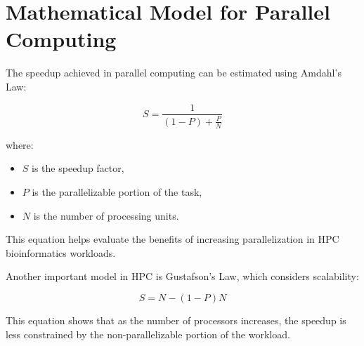 \documentclass[conference]{IEEEtran}
\begin{document}
\begin{table}[h]
    \centering
    \vspace{5pt}
    \caption{Performance comparison of different HPC architectures.}
    \label{tab:performance}
\end{table}

\section*{\textbf{Mathematical Model for Parallel Computing}}
The speedup achieved in parallel computing can be estimated using Amdahl’s Law:

\begin{equation}
    S = \frac{1}{(1 - P) + \frac{P}{N}}
\end{equation}

where:
\begin{itemize}
    \item $S$ is the speedup factor,
    \item $P$ is the parallelizable portion of the task,
    \item $N$ is the number of processing units.
\end{itemize}

This equation helps evaluate the benefits of increasing parallelization in HPC bioinformatics workloads.

Another important model in HPC is Gustafson’s Law, which considers scalability:

\begin{equation}
    S = N - (1 - P)N
\end{equation}

This equation shows that as the number of processors increases, the speedup is less constrained by the non-parallelizable portion of the workload.
\end{document}
